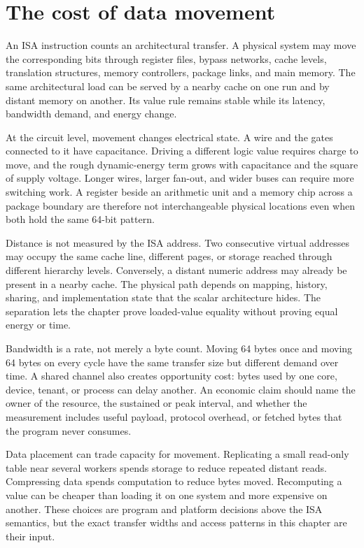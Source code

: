 \section{The cost of data movement}

An ISA instruction counts an architectural transfer. A physical system may
move the corresponding bits through register files, bypass networks, cache
levels, translation structures, memory controllers, package links, and main
memory. The same architectural load can be served by a nearby cache on one
run and by distant memory on another. Its value rule remains stable while its
latency, bandwidth demand, and energy change.

At the circuit level, movement changes electrical state. A wire and the gates
connected to it have capacitance. Driving a different logic value requires
charge to move, and the rough dynamic-energy term grows with capacitance and
the square of supply voltage. Longer wires, larger fan-out, and wider buses
can require more switching work. A register beside an arithmetic unit and a
memory chip across a package boundary are therefore not interchangeable
physical locations even when both hold the same 64-bit pattern.

Distance is not measured by the ISA address. Two consecutive virtual
addresses may occupy the same cache line, different pages, or storage reached
through different hierarchy levels. Conversely, a distant numeric address
may already be present in a nearby cache. The physical path depends on mapping,
history, sharing, and implementation state that the scalar architecture hides.
The separation lets the chapter prove loaded-value equality without proving equal
energy or time.

Bandwidth is a rate, not merely a byte count. Moving 64 bytes once and moving
64 bytes on every cycle have the same transfer size but different demand over
time. A shared channel also creates opportunity cost: bytes used by one core,
device, tenant, or process can delay another. An economic claim should name
the owner of the resource, the sustained or peak interval, and whether the
measurement includes useful payload, protocol overhead, or fetched bytes that
the program never consumes.

Data placement can trade capacity for movement. Replicating a small read-only
table near several workers spends storage to reduce repeated distant reads.
Compressing data spends computation to reduce bytes moved. Recomputing a value
can be cheaper than loading it on one system and more expensive on another.
These choices are program and platform decisions above the ISA semantics, but
the exact transfer widths and access patterns in this chapter are their input.

